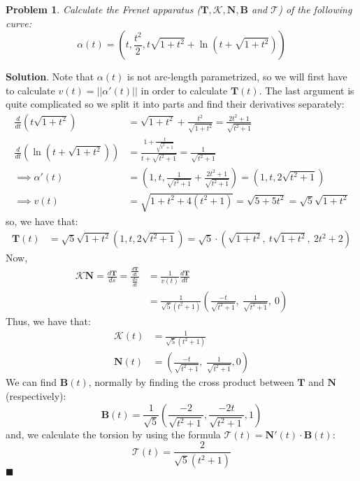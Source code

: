\documentclass[12pt]{article}
\newcommand{\abs}[1]{\left| #1 \right|} %
\renewcommand{\=}[1]{\stackrel{#1}{=}} %
\newtheorem{p}{Problem}[section]
\theoremstyle{definition}
\newenvironment{s}{%
        \begin{trivlist} \item \textbf{Solution}. }{%
            \hspace*{\fill} $\blacksquare$\end{trivlist}}%
\begin{document}
\begin{p}
    Calculate the Frenet apparatus ($\mathbf{T}, \mathcal{K}, \mathbf{N}, \mathbf{B}$ and $\mathcal{T}$) of the
    following curve:
    \[ \alpha(t) = (t, \frac{t^2}{2}, t\sqrt{1+t^2} + \ln(t+\sqrt{1+t^2})) \]
\end{p}
\begin{s}
    Note that $\alpha(t)$ is not arc-length parametrized, so we will first have to calculate $v(t) = \abs{\abs{\alpha'(t)}}$ in order
    to calculate $\mathbf{T}(t)$. The last argument is quite complicated so we split it into parts and find their
    derivatives separately:
    \begin{align*}
        \frac{d}{dt}(t\sqrt{1+t^2}) &= \sqrt{1+t^2} + \frac{t^2}{\sqrt{1+t^2}} = \frac{2t^2+1}{\sqrt{t^2+1}} \\
        \frac{d}{dt}(\ln(t+\sqrt{1+t^2})) &= \frac{1+\frac{t}{\sqrt{t^2+1}}}{t+\sqrt{t^2+1}} = \frac{1}{\sqrt{t^2+1}} \\
        \implies \alpha'(t) &= (1, t, \frac{1}{\sqrt{t^2+1}} + \frac{2t^2+1}{\sqrt{t^2+1}}) = (1,t,2\sqrt{t^2+1}) \\
        \implies v(t) &= \sqrt{1+t^2+4(t^2+1)} = \sqrt{5+5t^2} = \sqrt{5}\sqrt{1+t^2}
    \end{align*}
    so, we have that:
    \begin{align*}
        \mathbf{T}(t) &= \sqrt{5}\sqrt{1+t^2}(1,t,2\sqrt{t^2+1}) = \sqrt{5}\cdot(\sqrt{1+t^2},\: t\sqrt{1+t^2},\: 
        2t^2+2)
    \end{align*}
    Now,
    \begin{align*}
        \mathcal{K}\mathbf{N} = \frac{d\mathbf{T}}{ds} = \frac{\frac{d\mathbf{T}}{dt}}{\frac{ds}{dt}} 
        &= \frac{1}{v(t)}\frac{d\mathbf{T}}{dt} \\
        &= \frac{1}{\sqrt{5}(t^2+1)}(\frac{-t}{\sqrt{t^2+1}},\:\frac{1}{\sqrt{t^2+1}},\:0)
    \end{align*}
    Thus, we have that:
    \begin{align*}
        \mathcal{K}(t) &= \frac{1}{\sqrt{5}(t^2+1)} \\
        \mathbf{N}(t) &= (\frac{-t}{\sqrt{t^2+1}},\:\frac{1}{\sqrt{t^2+1}}, 0)
    \end{align*}
    We can find $\mathbf{B}(t)$, normally by finding the cross product between $\mathbf{T}$ and 
    $\mathbf{N}$ (respectively):
    \[ \mathbf{B}(t) = \frac{1}{\sqrt{5}}(\frac{-2}{\sqrt{t^2+1}}, \frac{-2t}{\sqrt{t^2+1}}, 1) \]
    and, we calculate the torsion by using the formula $\mathcal{T}(t) = \mathbf{N}'(t)\cdot\mathbf{B}(t)$:
    \[ \mathcal{T}(t) = \frac{2}{\sqrt{5}(t^2+1)} \]
\end{s}
\end{document}
